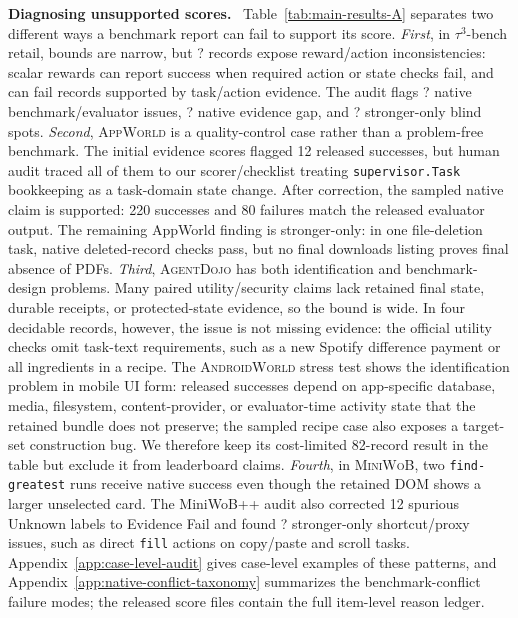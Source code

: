 \documentclass{article}
\newcommand{\agentdojo}{\textsc{AgentDojo}\xspace}
\newcommand{\appworld}{\textsc{AppWorld}\xspace}
\newcommand{\tauthree}{\(\tau^3\)-bench retail\xspace}
\newcommand{\androidworld}{\textsc{AndroidWorld}\xspace}
\newcommand{\miniwob}{\textsc{MiniWoB}\xspace}
\newcommand{\fillfromdata}{\textsc{\color{red}?}}
\newcommand{\runin}[1]{\noindent\textbf{#1}\ }
\providecommand{\TAULabelConflicts}{\fillfromdata}
\providecommand{\MWBAuditStrongerIssues}{\fillfromdata}
\providecommand{\TAUAuditBenchmarkIssues}{\fillfromdata}
\providecommand{\TAUAuditEvidenceGaps}{\fillfromdata}
\providecommand{\TAUAuditStrongerIssues}{\fillfromdata}
\begin{document}
\runin{Diagnosing unsupported scores.}
Table~\ref{tab:main-results-A} separates two different ways a benchmark report
can fail to support its score. \textit{First}, in \tauthree, bounds are narrow,
but \TAULabelConflicts{} records expose reward/action
inconsistencies: scalar rewards can report success when required action or
state checks fail, and can fail records supported by task/action evidence. The
audit flags \TAUAuditBenchmarkIssues{} native benchmark/evaluator issues,
\TAUAuditEvidenceGaps{} native evidence gap, and
\TAUAuditStrongerIssues{} stronger-only blind spots. \textit{Second},
\appworld is a quality-control case rather than a problem-free benchmark. The
initial evidence scores flagged 12 released successes, but human audit traced
all of them to our scorer/checklist treating \texttt{supervisor.Task}
bookkeeping as a task-domain state change. After correction, the sampled native
claim is supported: 220 successes and 80 failures match the released evaluator
output. The remaining AppWorld finding is stronger-only: in one file-deletion
task, native deleted-record checks pass, but no final downloads listing
proves final absence of PDFs.
\textit{Third}, \agentdojo has both identification and benchmark-design
problems. Many paired utility/security claims lack retained final state,
durable receipts, or protected-state evidence, so the bound is wide. In four
decidable records, however, the issue is not missing evidence: the official
utility checks omit task-text requirements, such as a new Spotify difference
payment or all ingredients in a recipe. The \androidworld stress test shows the
identification problem in mobile UI form: released successes depend on
app-specific database, media, filesystem, content-provider, or evaluator-time
activity state that the retained bundle does not preserve; the sampled recipe
case also exposes a target-set construction bug. We therefore keep
its cost-limited 82-record result in the table but exclude it
from leaderboard claims. \textit{Fourth}, in \miniwob, two
\texttt{find-greatest} runs receive native success even though the retained DOM
shows a larger unselected card. The MiniWoB++ audit also corrected 12 spurious
Unknown labels to Evidence Fail and found \MWBAuditStrongerIssues{}
stronger-only shortcut/proxy issues, such as direct \texttt{fill} actions on
copy/paste and scroll tasks. Appendix~\ref{app:case-level-audit} gives
case-level examples of these patterns, and
Appendix~\ref{app:native-conflict-taxonomy} summarizes the benchmark-conflict
failure modes; the released score files contain the full item-level reason
ledger.
\end{document}
